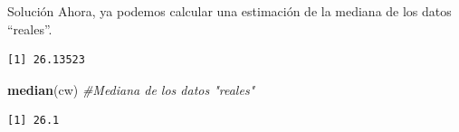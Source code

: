 \documentclass[
  ignorenonframetext,
]{beamer}
\newenvironment{Shaded}{\begin{snugshade}}{\end{snugshade}}
\newcommand{\CommentTok}[1]{\textcolor[rgb]{0.56,0.35,0.01}{\textit{#1}}}
\newcommand{\DecValTok}[1]{\textcolor[rgb]{0.00,0.00,0.81}{#1}}
\newcommand{\FunctionTok}[1]{\textcolor[rgb]{0.13,0.29,0.53}{\textbf{#1}}}
\newcommand{\NormalTok}[1]{#1}
\newcommand{\OtherTok}[1]{\textcolor[rgb]{0.56,0.35,0.01}{#1}}
\newcommand{\SpecialCharTok}[1]{\textcolor[rgb]{0.81,0.36,0.00}{\textbf{#1}}}
\begin{document}
\begin{frame}[fragile]{Solución}
\label{soluciuxf3n-34}
Ahora, ya podemos calcular una estimación de la mediana de los datos
``reales''.

\begin{Shaded}
\end{Shaded}

\begin{verbatim}
[1] 26.13523
\end{verbatim}

\begin{Shaded}
\begin{Highlighting}[]
\FunctionTok{median}\NormalTok{(cw) }\CommentTok{\#Mediana de los datos "reales"}
\end{Highlighting}
\end{Shaded}

\begin{verbatim}
[1] 26.1
\end{verbatim}
\end{frame}
\end{document}
